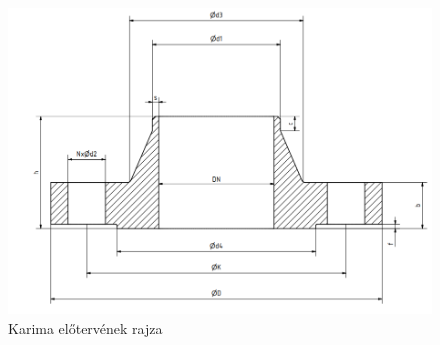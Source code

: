 \newpage
\begin{figure}[hbt!]
	\centering
	\includegraphics[scale=.61]{./images/karima.png}
	\caption{Karima előtervének rajza}
\end{figure}

